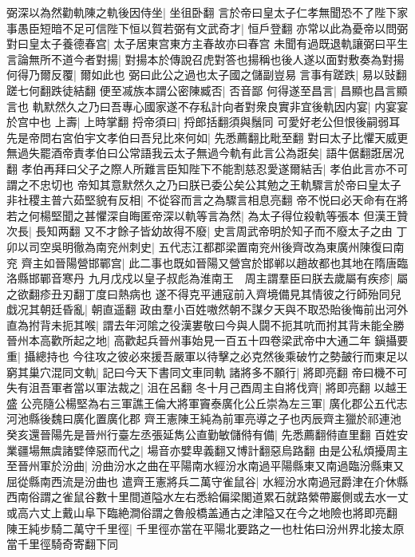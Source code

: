 弼深以為然勸軌陳之軌後因侍坐|{
	坐徂卧翻}
言於帝曰皇太子仁孝無聞恐不了陛下家事愚臣短暗不足可信陛下恒以賀若弼有文武奇才|{
	恒戶登翻}
亦常以此為憂帝以問弼對曰皇太子養德春宫|{
	太子居東宫東方主春故亦曰春宫}
未聞有過既退軌讓弼曰平生言論無所不道今者對揚|{
	對揚本於傳說召虎對答也揚稱也後人遂以面對敷奏為對揚}
何得乃爾反覆|{
	爾如此也}
弼曰此公之過也太子國之儲副豈易言事有蹉跌|{
	易以䜴翻蹉七何翻跌徒結翻}
便至㓕族本謂公密陳臧否|{
	否音鄙}
何得遂至昌言|{
	昌顯也昌言顯言也}
軌默然久之乃曰吾專心國家遂不存私計向者對衆良實非宜後軌因内宴|{
	内宴宴於宫中也}
上壽|{
	上時掌翻}
捋帝須曰|{
	捋郎括翻須與鬚同}
可愛好老公但恨後嗣弱耳先是帝問右宮伯宇文孝伯曰吾兒比來何如|{
	先悉薦翻比毗至翻}
對曰太子比懼天威更無過失罷酒帝責孝伯曰公常語我云太子無過今軌有此言公為誑矣|{
	語牛倨翻誑居况翻}
孝伯再拜曰父子之際人所難言臣知陛下不能割慈忍愛遂爾結舌|{
	孝伯此言亦不可謂之不忠切也}
帝知其意默然久之乃曰朕已委公矣公其勉之王軌驟言於帝曰皇太子非社稷主普六茹堅貌有反相|{
	不從容而言之為驟言相息亮翻}
帝不悦曰必天命有在將若之何楊堅聞之甚懼深自晦匿帝深以軌等言為然|{
	為太子得位殺軌等張本}
但漢王贊次長|{
	長知两翻}
又不才餘子皆幼故得不廢|{
	史言周武帝明於知子而不廢太子之由}
丁卯以司空吳明徹為南兖州刺史|{
	五代志江都郡梁置南兖州後齊改為東廣州陳復曰南兖}
齊主如晉陽營邯鄲宫|{
	此二事也既如晉陽又營宫於邯郸以趙故都也其地在隋唐臨洛縣邯鄲音寒丹}
九月戊戍以皇子叔彪為淮南王　周主謂羣臣曰朕去歲屬有疾疹|{
	屬之欲翻疹丑刃翻丁度曰熱病也}
遂不得克平逋寇前入齊境備見其情彼之行師殆同兒戱况其朝廷昏亂|{
	朝直遥翻}
政由羣小百姓嗷然朝不謀夕天與不取恐貽後悔前出河外直為拊背未扼其喉|{
	謂去年河隂之役漢婁敬曰今與人闘不扼其吭而拊其背未能全勝}
晉州本高歡所起之地|{
	高歡起兵晉州事始見一百五十四卷梁武帝中大通二年}
鎭攝要重|{
	攝總持也}
今往攻之彼必來援吾嚴軍以待擊之必克然後乘破竹之勢皷行而東足以窮其巢穴混同文軌|{
	記曰今天下書同文車同軌}
諸將多不願行|{
	將即亮翻}
帝曰機不可失有沮吾軍者當以軍法裁之|{
	沮在呂翻}
冬十月己酉周主自將伐齊|{
	將即亮翻}
以越王盛公亮隨公楊堅為右三軍譙王倫大將軍竇泰廣化公丘崇為左三軍|{
	廣化郡公五代志河池縣後魏曰廣化置廣化郡}
齊王憲陳王純為前軍亮導之子也丙辰齊主獵於祁連池癸亥還晉陽先是晉州行臺左丞張延雋公直勤敏儲偫有備|{
	先悉薦翻偫直里翻}
百姓安業疆場無虞諸嬖倖惡而代之|{
	場音亦嬖卑義翻又博計翻惡烏路翻}
由是公私煩擾周主至晉州軍於汾曲|{
	汾曲汾水之曲在平陽南水經汾水南過平陽縣東又南過臨汾縣東又屈從縣南西流是汾曲也}
遣齊王憲將兵二萬守雀鼠谷|{
	水經汾水南過冠爵津在介休縣西南俗謂之雀鼠谷數十里間道隘水左右悉給偏梁閣道累石就路縈帶巖側或去水一丈或高六丈上戴山阜下臨絶澗俗謂之魯般橋盖通古之津隘又在今之地險也將即亮翻}
陳王純步騎二萬守千里徑|{
	千里徑亦當在平陽北要路之一也杜佑曰汾州界北接太原當千里徑騎奇寄翻下同}

